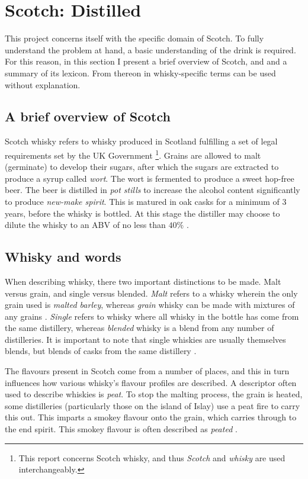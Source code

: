 \section{Scotch: Distilled}\label{sec:whisky}
This project concerns itself with the specific domain of Scotch. To fully understand the problem at hand, a basic
understanding of the drink is required.  For this reason, in this section I present a brief overview of Scotch, and 
and a summary of its lexicon. From thereon in whisky-specific terms can be used without explanation.

\subsection{A brief overview of Scotch}
Scotch whisky refers to whisky produced in Scotland fulfilling a set of legal requirements set by the UK Government 
\cite{legislation.gov.uk_2009}\footnote{This report concerns Scotch whisky, and thus \emph{Scotch} and \emph{whisky} 
are used interchangeably.}.  Grains are allowed to malt (germinate) to develop their sugars, after which the sugars are
extracted to produce a syrup called \emph{wort}.  The wort is fermented to produce a sweet hop-free beer.  The beer is
distilled in \emph{pot stills} to increase the alcohol content significantly to produce \emph{new-make spirit}. This
is matured in oak casks for a minimum of 3 years, before the whisky is bottled.  At this stage the distiller may choose
to dilute the whisky to an ABV of no less than $40\%$ \cite{Jacques2003, Pyke1965}.

\subsection{Whisky and words}
When describing whisky, there two important distinctions to be made.  Malt versus grain, and single versus blended.  
\emph{Malt} refers to a whisky wherein the only grain used is \emph{malted barley}, whereas \emph{grain} whisky can 
be made with mixtures of any grains \cite{Valaer1940}.  \emph{Single} refers to whisky where all whisky in the bottle
has come from the same distillery, whereas \emph{blended} whisky is a blend from any number of distilleries.  It is
important to note that single whiskies are usually themselves blends, but blends of casks from the same distillery 
\cite{Smith2017}.

The flavours present in Scotch come from a number of places, and this in turn influences how various whisky's
flavour profiles are described.  A descriptor often used to describe whiskies is \emph{peat}.
To stop the malting process, the grain is heated, some distilleries (particularly those on the island of Islay) use
a peat fire to carry this out.  This imparts a smokey flavour onto the grain, which carries through to the end spirit.
This smokey flavour is often described as \emph{peated} \cite{Jacques2003, Bathgate2019}.

